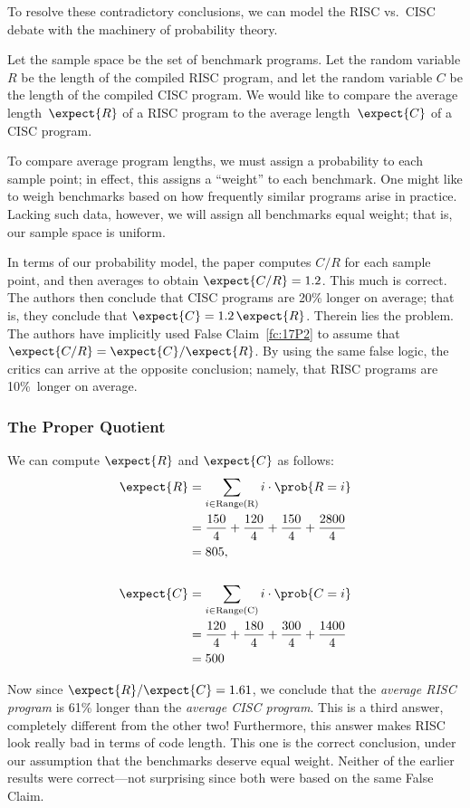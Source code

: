 \begin{editingnotes}
To resolve these contradictory conclusions, we can model the RISC
vs.\ CISC debate with the machinery of probability theory.

Let the sample space be the set of benchmark programs.  Let the random
variable $R$ be the length of the compiled RISC program, and let the
random variable $C$ be the length of the compiled CISC program.  We would
like to compare the average length~$\expect{R}$ of a RISC program to the
average length~$\expect{C}$ of a CISC program.

To compare average program lengths, we must assign a probability to
each sample point; in effect, this assigns a ``weight'' to each
benchmark.  One might like to weigh benchmarks based on how frequently
similar programs arise in practice.  Lacking such data, however, we
will assign all benchmarks equal weight; that is, our sample space is
uniform.

In terms of our probability model, the paper computes $C / R$ for each
sample point, and then averages to obtain $\expect{C / R} = 1.2$.
This much is correct.  The authors then conclude that CISC programs
are 20\% longer on average; that is, they conclude that $\expect{C} =
1.2\, \expect{R}$.  Therein lies the problem.  The authors have
implicitly used False Claim~\ref{fc:17P2} to assume that $\expect{C/R}
= \expect{C}/\expect{R}$.  By using the same false logic, the critics
can arrive at the opposite conclusion; namely, that RISC programs are
10\%~longer on average.

\subsubsection{The Proper Quotient}

We can compute $\expect{R}$ and $\expect{C}$ as follows:
\begin{align*}
\expect{R}  
    & = \sum_{i \in \text{Range(R)}} i \cdot \prob{R = i} \\
    & = \frac{150}{4}+\frac{120}{4}+\frac{150}{4}+\frac{2800}{4} \\
    & = 805, \\
\\
\expect{C}
    & = \sum_{i \in \text{Range(C)}} i \cdot \prob{C = i} \\
    & = \frac{120}{4}+\frac{180}{4}+\frac{300}{4}+\frac{1400}{4} \\
    & = 500
\end{align*}

Now since $\expect{R}/\expect{C} = 1.61$, we conclude that the
\emph{average RISC program} is 61\% longer than the \emph{average CISC
  program}.  This is a third answer, completely different from the
other two!  Furthermore, this answer makes RISC look really bad in
terms of code length.  This one is the correct conclusion, under our
assumption that the benchmarks deserve equal weight.  Neither of the
earlier results were correct---not surprising since both were based on
the same False Claim.


\end{editingnotes}
